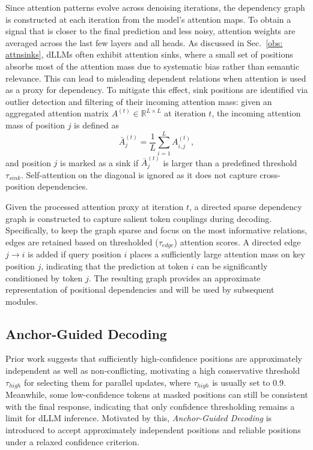 Since attention patterns evolve across denoising iterations, the dependency graph is constructed at each iteration from the model's attention maps. To obtain a signal that is closer to the final prediction and less noisy, attention weights are averaged across the last few layers and all heads. As discussed in Sec.~\ref{obs: attnsinks}, dLLMs often exhibit attention sinks, where a small set of positions absorbs most of the attention mass due to systematic bias rather than semantic relevance. This can lead to misleading dependent relations when attention is used as a proxy for dependency. To mitigate this effect, sink positions are identified via outlier detection and filtering of their incoming attention mass: given an aggregated attention matrix $A^{(t)}\in\mathbb{R}^{L\times L}$ at iteration $t$, the incoming attention mass of position $j$ is defined as
\begin{equation*}
\bar{A}^{(t)}_j = \frac{1}{L}\sum_{i=1}^{L} A^{(t)}_{i,j},
\end{equation*}
and position $j$ is marked as a sink if $\bar{A}^{(t)}_j$ is larger than a predefined threshold $\tau_{sink}$. Self-attention on the diagonal is ignored as it does not capture cross-position dependencies.

Given the processed attention proxy at iteration $t$, a directed sparse dependency graph is constructed to capture salient token couplings during decoding. 
Specifically, to keep the graph sparse and focus on the most informative relations, edges are retained based on thresholded ($\tau_{edge}$) attention scores. A directed edge $j\!\rightarrow\! i$ is added if query position $i$ places a sufficiently large attention mass on key position $j$, indicating that the prediction at token $i$ can be significantly conditioned by token $j$. 
 The resulting graph provides an approximate representation of positional dependencies and will be used by subsequent modules.

\subsection{Anchor-Guided Decoding}
Prior work \cite{fastdllm} suggests that sufficiently high-confidence positions are approximately independent as well as non-conflicting, motivating a high conservative threshold $\tau_{high}$ for selecting them for parallel updates, where $\tau_{high}$ is usually set to 0.9. 
Meanwhile, some low-confidence tokens at masked positions can still be consistent with the final response, indicating that only confidence thresholding remains a limit for dLLM inference. Motivated by this, \textit{Anchor-Guided Decoding} is introduced to accept approximately independent positions and reliable positions under a relaxed confidence criterion. 


